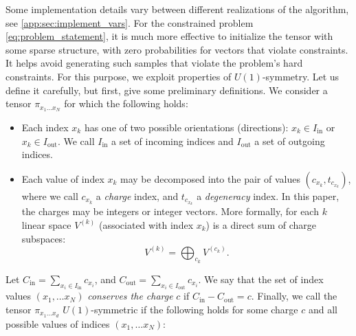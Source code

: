 \documentclass{article}
\theoremstyle{plain}
\theoremstyle{definition}
\theoremstyle{remark}
\begin{document}
Some implementation details vary between different realizations of the algorithm, see \cref{app:sec:implement_vars}. 
For the constrained problem \eqref{eq:problem_statement}, it is much more effective to initialize the tensor with some sparse structure, with zero probabilities for vectors that violate constraints. It helps avoid generating such samples that violate the problem's hard constraints. For this purpose, we exploit properties of $U(1)$-symmetry. Let us define it carefully, but first, give some preliminary definitions. We consider a tensor $\pi_{x_1\dots x_N}$ for which the following holds: 
\begin{itemize}
    \item Each index $x_k$ has one of two possible orientations (directions): $x_k \in I_{\text{in}}$ or $x_k \in I_{\text{out}}$. We call $I_{\text{in}}$ a set of incoming indices and $I_{\text{out}}$ a set of outgoing indices.
    
    \item Each value of index $x_k$ may be decomposed into the pair of values $(c_{x_k}, t_{c_{x_{k}}})$, where we call $c_{x_k}$ a \textit{charge} index, and  $t_{c_{x_{k}}}$ a \textit{degeneracy} index. In this paper, the charges may be integers or integer vectors. More formally, for each $k$ linear space $V^{(k)}$ (associated with index $x_k$) is a direct sum of charge subspaces:
    \begin{equation}
    \label{eq:direct_sum}
        V^{(k)} = \bigoplus_{c_k}V^{(c_k)}.
    \end{equation}
\end{itemize}

Let $C_{\text{in}} = \sum_{x_i \in I_{\text{in}}}c_{x_i}$, and $C_{\text{out}}=\sum_{x_i\in I_{\text{out}}}c_{x_i}$.
We say that the set of index values $(x_1,\dots x_N)$ \textit{conserves the charge} $c$ if $C_{\text{in}} - C_{\text{out}}=c$.
Finally, we call the tensor $\pi_{x_1\dots x_d}$ $U(1)$-symmetric if the following holds for some charge $c$ and all possible values of indices $(x_1,\dots x_N)$:
\end{document}
